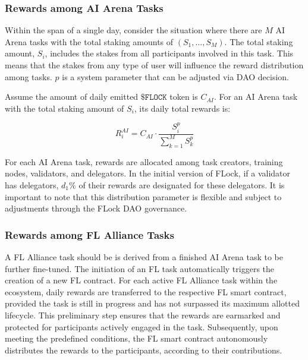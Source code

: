 \documentclass[conference]{IEEEtran}
\newcommand{\FL}{\ac{FL} Alliance\xspace}
\newcommand{\SNT}{{AI Arena}\xspace}
\newcommand{\FML}{\ensuremath{\xspace\texttt{\$FLOCK}}\xspace}
\begin{document}



\subsubsection{Rewards among \SNT Tasks}

Within the span of a single day, consider the situation where there are $M$ \SNT tasks with the total staking amounts of $(S_1, \ldots, S_M)$. The total staking amount, $S_i$, includes the stakes from all participants involved in this task. This means that the stakes from any type of user will influence the reward distribution among tasks.
$p$  is a system parameter that can be adjusted via DAO decision.

Assume the amount of daily emitted \FML token is $C_{AI}$. For an \SNT task with the total staking amount of $S_i$, its daily total rewards is: 
        
$$R^{AI}_i = C_{AI} \cdot \frac{S^p_i}{\sum_{k=1}^{M}{S^p_k} }$$

 For each \SNT task, rewards are allocated among task creators, training nodes, validators, and delegators. In the initial version of FLock,  if a validator has delegators, $d_1\%$ of their rewards are designated for these delegators. It is important to note that this distribution parameter is flexible and subject to adjustments through the FLock DAO governance.

\subsubsection{Rewards among \FL Tasks} A \FL task should be is derived from a finished \SNT task to be further fine-tuned.  The initiation  of an FL task automatically triggers the creation of a new FL contract. 
For each active \FL task within the ecosystem, daily rewards are transferred  to the respective FL smart contract, provided the task is still in progress and has not surpassed its maximum allotted lifecycle. This preliminary step ensures that the rewards are earmarked and protected for participants actively engaged in the task. Subsequently, upon meeting the predefined conditions, the FL smart contract autonomously distributes the rewards to the participants, according to their contributions. 
\end{document}
